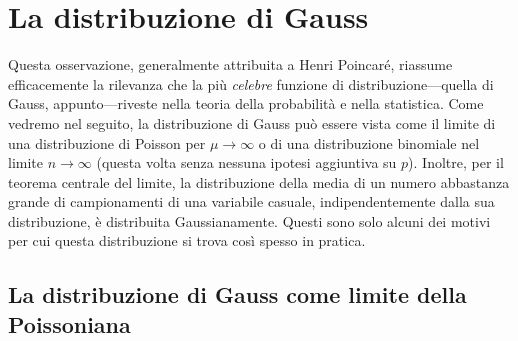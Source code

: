 \section{La distribuzione di Gauss}
\label{sec:distribuzione_gauss}

Questa osservazione, generalmente attribuita a Henri Poincaré, riassume
efficacemente la rilevanza che la più \emph{celebre} funzione di
distribuzione---quella di Gauss, appunto---riveste nella teoria della
probabilità e nella statistica. Come vedremo nel seguito, la distribuzione di
Gauss può essere vista come il limite di una distribuzione di Poisson per
$\mu \rightarrow \infty$ o di una distribuzione binomiale nel limite
$n \rightarrow \infty$ (questa volta senza nessuna ipotesi aggiuntiva su $p$).
Inoltre, per il teorema centrale del limite, la distribuzione della media di
un numero abbastanza grande di campionamenti di una variabile casuale,
indipendentemente dalla sua distribuzione, è distribuita Gaussianamente.
Questi sono solo alcuni dei motivi per cui questa distribuzione si trova
così spesso in pratica.


\subsection{La distribuzione di Gauss come limite della Poissoniana}
\label{sec:gauss_limite_poisson}


